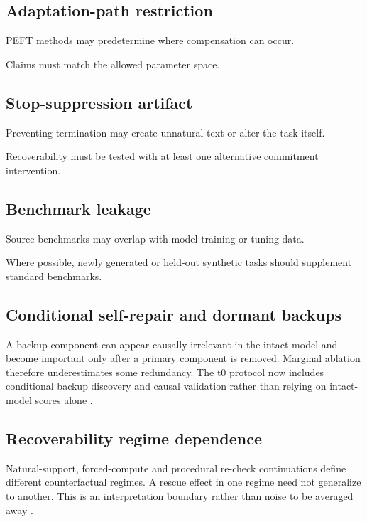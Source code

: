 \subsection{Adaptation-path restriction}\label{adaptation-path-restriction}

PEFT methods may predetermine where compensation can occur.

Claims must match the allowed parameter space.

\subsection{Stop-suppression artifact}\label{stop-suppression-artifact}

Preventing termination may create unnatural text or alter the task itself.

Recoverability must be tested with at least one alternative commitment intervention.

\subsection{Benchmark leakage}\label{benchmark-leakage}

Source benchmarks may overlap with model training or tuning data.

Where possible, newly generated or held-out synthetic tasks should supplement standard benchmarks.

\subsection{Conditional self-repair and dormant backups}\label{conditional-self-repair}

A backup component can appear causally irrelevant in the intact model and become important only after a primary component is removed. Marginal ablation therefore underestimates some redundancy. The t0 protocol now includes conditional backup discovery and causal validation rather than relying on intact-model scores alone \parencite{gong2026coax}.

\subsection{Recoverability regime dependence}\label{recoverability-regime-dependence}

Natural-support, forced-compute and procedural re-check continuations define different counterfactual regimes. A rescue effect in one regime need not generalize to another. This is an interpretation boundary rather than noise to be averaged away \parencite{wang2026detection}.

